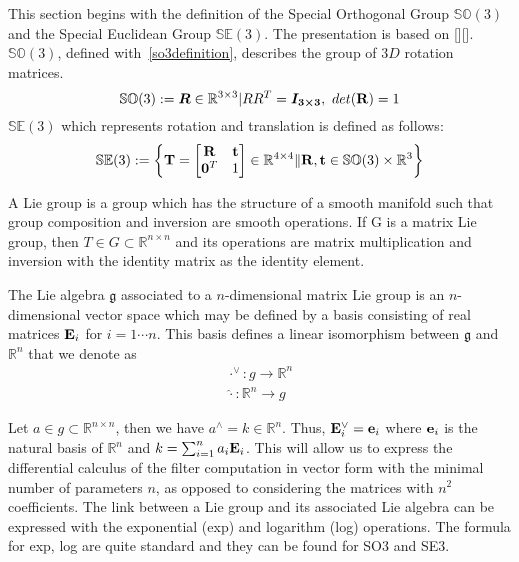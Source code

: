 \documentclass[a4paper]{report}
\begin{document}
This section begins with the definition of the Special Orthogonal Group $\mathbb{SO}(3)$ and the Special Euclidean Group $\mathbb{SE}(3)$. The presentation is based on [][]. $\mathbb{SO}(3)$, defined with~\eqref{so3definition}, describes the group of $3D$ rotation matrices.
\begin{equation}
\mathbb{SO}(3):={\bm{R} \in \mathbb{R}^{3 \times 3}|RR^T=\bm{I_{3 \times 3}},\ det(\bold{R})=1}
\label{eq:SO3definition}
\end{equation}
$\mathbb{SE}(3)$ which represents rotation and translation is defined as follows:
\begin{equation}
\mathbb{SE}(3):=\left\lbrace
\bold{T}=\left[
\begin{matrix} 
\bold{R} & \bold{t} \\
\bold{0}^T & 1
\end{matrix}
\right] \in \mathbb{R}^{4 \times 4} \| {\bold{R}, \bold{t}} 
\in \mathbb{SO}(3) \times \mathbb{R}^3 \right\rbrace
\label{eq:SE3definition}
\end{equation}

A Lie group is a group which has the structure of a smooth manifold such that group composition and inversion are smooth operations. If G is a matrix Lie group, then $T \in G \subset \mathbb{R}^{n \times n}$ and its operations are matrix multiplication and inversion with the identity matrix as the identity element.

The Lie algebra $\mathfrak{g}$ associated to a $n$-dimensional matrix Lie group is an $n$-dimensional vector space which may be defined by a basis consisting of real matrices $\bold{E}_i$ for $i=1 \cdots n$. This basis defines a linear isomorphism between $\mathfrak{g}$ and $\mathbb{R}^n$ that we denote as 
$$
\begin{matrix}
\cdot^{\vee}: g \to \mathbb{R}^n \\ 
\hat{\cdot}: \mathbb{R}^n \to g
\end{matrix}
$$

Let $a \in g \subset \mathbb{R}^{n \times n}$, then we have $a^{\land}=k \in \mathbb{R}^n$. Thus, $\bold{E}_i^{\vee}=\bold{e}_i$ where $\bold{e}_i$ is the natural basis of $\mathbb{R}^n$ and $k=\sum_{i=1}^{n}{a_i \bold{E}_i}$. This will allow us to express the differential calculus of the filter computation in vector form with the minimal number of parameters $n$, as opposed to considering the matrices with $n^2$ coefficients. The link between a Lie group and its associated Lie algebra can be expressed with the exponential (exp) and logarithm (log) operations. The formula for exp, log are quite standard and they can be found for SO3 and SE3.
\end{document}

